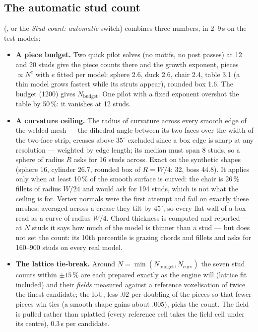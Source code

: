 \subsection{The automatic stud count}
 (, or the \emph{Stud count: automatic} switch) combines three numbers, in
2--9\,s on the test models:
\begin{itemize}
\item \textbf{A piece budget.} Two quick pilot solves (no motifs, no post passes) at 12 and 20 studs give the piece counts there
  and the growth exponent, pieces $\propto N^{e}$ with $e$ fitted per model: sphere 2.6, duck 2.6, chair 2.4, table 3.1 (a thin
  model grows fastest while its struts appear), rounded box 1.6. The budget  (1200) gives $N_{\text{budget}}$. One
  pilot with a fixed exponent overshot the table by 50\,\%: it vanishes at 12 studs.
\item \textbf{A curvature ceiling.} The radius of curvature across every smooth edge of the welded mesh --- the dihedral angle
  between its two faces over the width of the two-face strip, creases above $35^\circ$ excluded since a box edge is sharp at any
  resolution --- weighted by edge length; its median must span 8 studs, so a sphere of radius $R$ asks for 16 studs across. Exact on
  the synthetic shapes (sphere 16, cylinder 26.7, rounded box of $R = W/4$: 32, boss 44.8). It applies only when at least 10\,\%
  of the smooth surface is curved: the chair is 26\,\% fillets of radius $W/24$ and would ask for 194 studs, which is not what the
  ceiling is for. Vertex normals were the first attempt and fail on exactly these meshes: averaged across a crease they tilt by
  $45^\circ$, so every flat wall of a box read as a curve of radius $W/4$. Chord thickness is computed and reported --- at $N$ studs
  it says how much of the model is thinner than a stud --- but does not set the count: its 10th percentile is grazing chords and
  fillets and asks for 160--900 studs on every real model.
\item \textbf{The lattice tie-break.} Around $N = \min(N_{\text{budget}}, N_{\text{curv}})$ the seven stud counts within
  $\pm 15\,\%$ are each prepared exactly as the engine will (lattice fit included) and their \emph{fields} measured against a
  reference voxelisation of twice the finest candidate; the IoU, less $.02$ per doubling of the pieces so that fewer pieces win
  ties (a smooth shape gains about $.005$), picks the count. The field is pulled rather than splatted (every reference cell takes
  the field cell under its centre), 0.3\,s per candidate.
\end{itemize}

